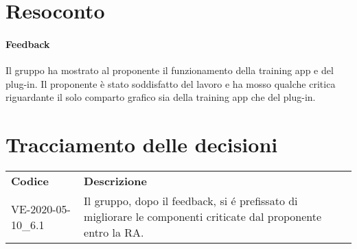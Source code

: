 \documentclass{article}
\begin{document}
\section{Resoconto}%
\label{resoconto}
\paragraph*{Feedback}
Il gruppo ha mostrato al proponente il funzionamento della training app e del plug-in. Il proponente è stato soddisfatto del lavoro e ha mosso qualche critica riguardante il solo comparto grafico sia della training app che del plug-in.

\section{Tracciamento delle decisioni}
\begin{table}[H]
  \centering
  \begin{tabular}{p{4cm}|p{12cm}}
    \rowcolor{lightgray}
    \textbf{Codice}  & \textbf{Descrizione}      \\
    VE-2020-05-10\_6.1 & Il gruppo, dopo il feedback, si é prefissato di migliorare le componenti criticate dal proponente entro la RA.\\
  \end{tabular}
\end{table}
\end{document}

